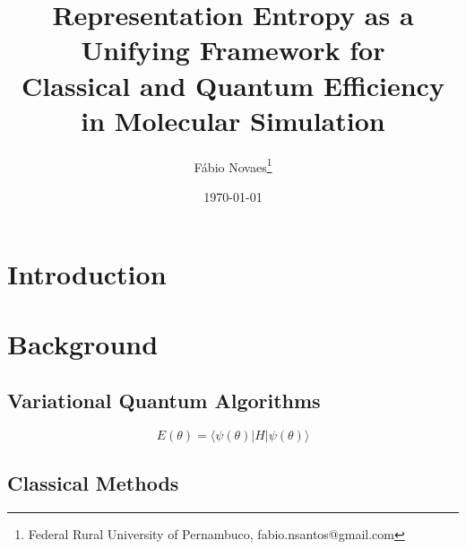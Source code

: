 \documentclass[11pt]{article}
\title{Representation Entropy as a Unifying Framework for\\
Classical and Quantum Efficiency in Molecular Simulation}
\author{Fábio Novaes\footnote{Federal Rural University of Pernambuco, fabio.nsantos@gmail.com}}
\date{\today}
\begin{document}
\maketitle

\begin{abstract}
\end{abstract}

\section{Introduction}




\section{Background}

\subsection{Variational Quantum Algorithms}

\begin{equation}
E(\theta) = \langle \psi(\theta) | H | \psi(\theta) \rangle
\end{equation}


\subsection{Classical Methods}
\end{document}

